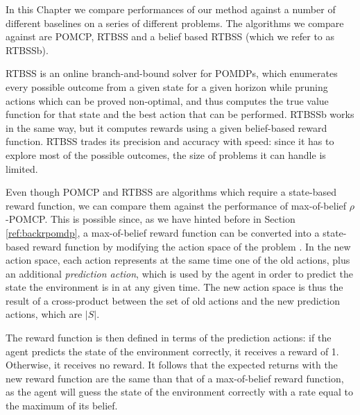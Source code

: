 In this %
Chapter we compare performances of our method against a number of different baselines on a
series of different problems. The algorithms we compare against are POMCP, RTBSS and a belief based
RTBSS (which we refer to as RTBSSb).

RTBSS \cite{cit:rtbss} is an online branch-and-bound solver \cite{cit:relworkonlineall} for POMDPs, which enumerates every possible outcome from
a given state for a given horizon while pruning actions which can be proved non-optimal, and thus computes the true value function for that state and the
best action that can be performed. RTBSSb works in the same way, but it computes rewards using a
given belief-based reward function. RTBSS trades its precision and accuracy with speed: since it has
to explore most of the possible outcomes, the size of problems it can handle is limited.

Even though POMCP and RTBSS are algorithms which require a state-based reward function, we can
compare them against the performance of max-of-belief $\rho$-POMCP. This is possible since, as we have hinted before in Section \ref{ref:backrpomdp}, a
max-of-belief reward function can be converted into a state-based reward function by modifying the
action space of the problem \cite{cit:pomdpir}. In the new action space, each action represents at
the same time one of the old actions, plus an additional \textit{prediction action}, which is used
by the agent in order to predict the state the environment is in at any given time. The new action
space is thus the result of a cross-product between the set of old actions and the new prediction
actions, which are $|S|$.

%

The reward function is then defined in terms of the prediction actions: if the agent predicts the
state of the environment correctly, it receives a reward of 1. Otherwise, it receives no reward. It
follows that the expected returns with the new reward function are the same than that of a
max-of-belief reward function, as the agent will guess the state of the environment correctly with a
rate equal to the maximum of its belief.

